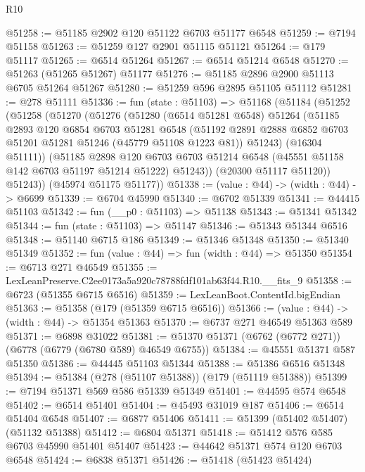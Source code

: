 \begin{lexlean}{R10}
\begin{coremodule}
@51258 := @51185 @2902 @120 @51122 @6703 @51177 @6548
@51259 := @7194 @51158
@51263 := @51259 @127 @2901 @51115 @51121
@51264 := @179 @51117
@51265 := @6514 @51264
@51267 := @6514 @51214 @6548
@51270 := @51263 (@51265 @51267) @51177
@51276 := @51185 @2896 @2900 @51113 @6705 @51264 @51267
@51280 := @51259 @596 @2895 @51105 @51112
@51281 := @278 @51111
@51336 := fun (state : @51103) =>
  @51168
    (@51184
      (@51252
        (@51258
          (@51270
            (@51276
              (@51280
                (@6514 @51281 @6548)
                @51264
                (@51185
                  @2893
                  @120
                  @6854
                  @6703
                  @51281
                  @6548
                  (@51192 @2891 @2888 @6852 @6703 @51201 @51281 @51246 (@45779 @51108 @1223 @81))
                  @51243)
                (@16304 @51111))
              (@51185
                @2898
                @120
                @6703
                @6703
                @51214
                @6548
                (@45551 @51158 @142 @6703 @51197 @51214 @51222)
                @51243))
            (@20300 @51117 @51120))
          @51243))
      (@45974 @51175 @51177))
@51338 := (value : @44) -> (width : @44) -> @6699
@51339 := @6704 @45990
@51340 := @6702 @51339
@51341 := @44415 @51103
@51342 := fun (__p0 : @51103) => @51138
@51343 := @51341 @51342
@51344 := fun (state : @51103) => @51147
@51346 := @51343 @51344 @6516
@51348 := @51140 @6715 @186
@51349 := @51346 @51348
@51350 := @51340 @51349
@51352 := fun (value : @44) => fun (width : @44) => @51350
@51354 := @6713 @271 @46549
@51355 := LexLeanPreserve.C2ee0173a5a920c78788fdf101ab63f44.R10.__fits_9
@51358 := @6723 (@51355 @6715 @6516)
@51359 := LexLeanBoot.ContentId.bigEndian
@51363 := @51358 (@179 (@51359 @6715 @6516))
@51366 := (value : @44) -> (width : @44) -> @51354 @51363
@51370 := @6737 @271 @46549 @51363 @589
@51371 := @6898 @31022
@51381 := @51370 @51371 (@6762 (@6772 @271)) (@6778 (@6779 (@6780 @589) @46549 @6755))
@51384 := @45551 @51371 @587 @51350
@51386 := @44445 @51103 @51344
@51388 := @51386 @6516 @51348
@51394 := @51384 (@278 (@51107 @51388)) (@179 (@51119 @51388))
@51399 := @7194 @51371 @569 @586 @51339 @51349
@51401 := @44595 @574 @6548
@51402 := @6514 @51401
@51404 := @45493 @31019 @187
@51406 := @6514 @51404 @6548
@51407 := @6877 @51406
@51411 := @51399 (@51402 @51407) (@51132 @51388)
@51412 := @6804 @51371
@51418 := @51412 @576 @585 @6703 @45990 @51401 @51407
@51423 := @44642 @51371 @574 @120 @6703 @6548
@51424 := @6838 @51371
@51426 := @51418 (@51423 @51424)

\end{coremodule}
\end{lexlean}
